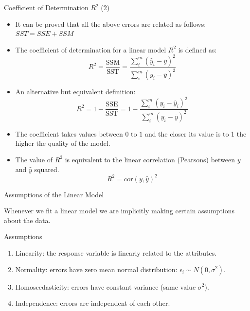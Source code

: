 \documentclass[handout]{beamer}
\begin{document}
\begin{frame}{Coefficient of Determination $R^2$ (2)}
\scriptsize{
\begin{itemize}
 \item It can be proved that all the above errors are related as follows: $SST = SSE + SSM$

 \item The coefficient of determination for a linear model $R^2$ is defined as:
 \begin{equation}
  R^2= \frac{\text{SSM}}{\text{SST}} = \frac{\sum_{i}^{m}(\hat{y}_i-\overline{y})^2 }{\sum_{i}^{m}(y_i-\overline{y})^2  }
 \end{equation}
 
 \item An alternative but equivalent definition:
  \begin{equation}
  R^2= 1-\frac{\text{SSE}}{\text{SST}} = 1- \frac{\sum_{i}^{m}(y_i-\hat{y}_i)^2 }{\sum_{i}^{m}(y_i-\overline{y})^2  }
 \end{equation}
 

 \item The coefficient takes values between $0$ to $1$ and the closer its value is to 1 the higher the quality of the model.
 
 \item The value of $R^2$ is equivalent to the linear correlation (Pearsons) between $y$ and $\hat{y}$ squared.
\begin{displaymath}
 R^2=\text{cor}(y,\hat{y})^2
\end{displaymath}
  
\end{itemize}


}
\end{frame}



\begin{frame}{Assumptions of the Linear Model}
\scriptsize{





Whenever we fit a linear model we are implicitly making certain assumptions about the data.  


\begin{block}{Assumptions}
\begin{enumerate}
\item Linearity: the response variable is linearly related to the attributes. 
\item  Normality: errors have zero mean normal distribution: $\epsilon_{i} \sim N(0,\sigma^2)$.
\item Homoscedasticity: errors have constant variance (same value $\sigma^2$).
\item Independence: errors are independent of each other.
 
\end{enumerate}
 
\end{block}

} 
\end{frame}
\end{document}
